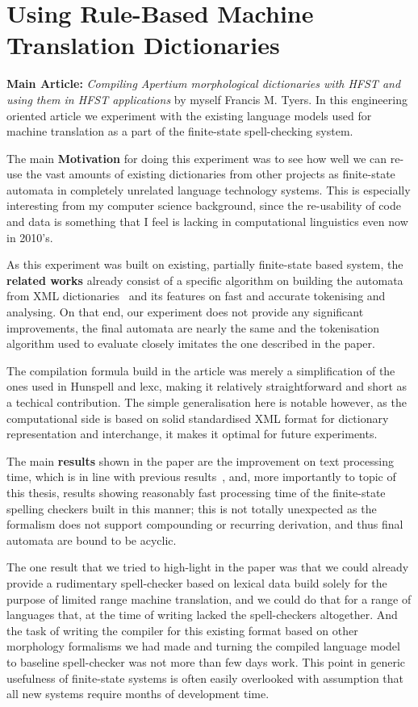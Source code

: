 \documentclass[officiallayout,draft]{unihelcompling}
\begin{document}
\section{Using Rule-Based Machine Translation Dictionaries}
\label{sec:apertium}

\textbf{Main Article:} \emph{Compiling Apertium morphological dictionaries with
HFST and using them in HFST applications} by myself Francis M. Tyers. In this
engineering oriented article we experiment with the existing language models
used for machine translation as a part of the finite-state spell-checking
system.

The main \textbf{Motivation} for doing this experiment was to see how well we
can re-use the vast amounts of existing dictionaries from other projects as
finite-state automata in completely unrelated language technology systems.
This is especially interesting from my computer science background, since
the re-usability of code and data is something that I feel is lacking in
computational linguistics even now in 2010's.

As this experiment was built on existing, partially finite-state based system,
the \textbf{related works} already consist of a specific algorithm on building
the automata from XML dictionaries~\citep{rojas2005construccion} and its
features on fast and accurate tokenising and analysing. On that end,
our experiment does not provide any significant improvements, the final
automata are nearly the same and the tokenisation algorithm used to evaluate
closely imitates the one described in the paper.

The compilation formula build in the article was merely a simplification of
the ones used in Hunspell and lexc, making it relatively straightforward and
short as a techical contribution. The simple generalisation here is notable
however, as the computational side is based on solid standardised XML
format for dictionary representation and interchange, it makes it optimal
for future experiments.

The main \textbf{results} shown in the paper are the improvement on text
processing time, which is in line with previous
results~\citep{silfverberg2009hfst}, and, more importantly to topic of this
thesis, results showing reasonably fast processing time of the finite-state
spelling checkers built in this manner; this is not totally unexpected as the
formalism does not support compounding or recurring derivation, and thus final
automata are bound to be acyclic. 

The one result that we tried to high-light in the paper was that we could
already provide a rudimentary spell-checker based on lexical data build solely
for the purpose of limited range machine translation, and we could do that for
a range of languages that, at the time of writing lacked the spell-checkers
altogether. And the task of writing the compiler for this existing format
based on other morphology formalisms we had made and turning the compiled
language model to baseline spell-checker was not more than few days work. This
point in generic usefulness of finite-state systems is often easily overlooked
with assumption that all new systems require months of development time.
\end{document}
